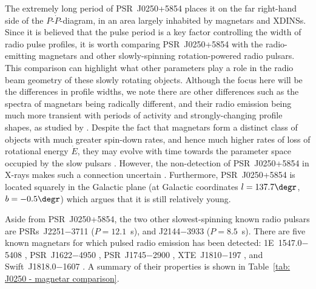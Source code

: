 The extremely long period of PSR~J0250+5854 places it on the far right-hand side of the $P$-$\dot{P}$-diagram, in an area largely inhabited by magnetars and XDINSs. Since it is believed that the pulse period is a key factor controlling the width of radio pulse profiles, it is worth comparing PSR~J0250+5854 with the radio-emitting magnetars and other slowly-spinning rotation-powered radio pulsars. This comparison can highlight what other parameters play a role in the radio beam geometry of these slowly rotating objects. Although the focus here will be the differences in profile widths, we note there are other differences such as the spectra of magnetars being radically different, and their radio emission being much more transient with periods of activity and strongly-changing profile shapes, as studied by \citet{SSW+2009, DJW+2018, LLD+2019, DLB+2019,LJS+2021}. Despite the fact that magnetars form a distinct class of objects with much greater spin-down rates, and hence much higher rates of loss of rotational energy $\dot{E}$, they may evolve with time towards the parameter space occupied by the slow pulsars \citep[e.g.][]{VRP+2013}. However, the non-detection of PSR~J0250+5854 in X-rays makes such a connection uncertain \citep{TBC+2018}. Furthermore, PSR~J0250+5854 is located squarely in the Galactic plane (at Galactic coordinates $l=137.7\degr$, $b=-0.5\degr$) which argues that it is still relatively young.

Aside from PSR~J0250+5854, the two other slowest-spinning known radio pulsars are PSRs~J2251$-$3711 ($P=12.1$~s), and J2144$-$3933 ($P=8.5$~s). There are five known magnetars for which pulsed radio emission has been detected: 1E~1547.0$-$5408 \citep{CRHR2007a}, PSR~J1622$-$4950 \citep{LBB+2010}, PSR~J1745$-$2900 \citep{EFK+2013}, XTE~J1810$-$197 \citep{CRH+2006}, and Swift~J1818.0$-$1607 \citep{ERB+2020, LSJB2020}. A summary of their properties is shown in Table~\ref{tab: J0250 - magnetar comparison}.

